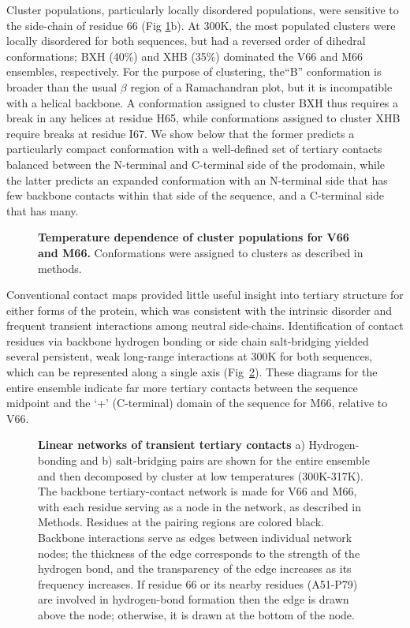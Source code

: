 \documentclass[10pt,letterpaper]{article}
\begin{document}
Cluster populations, particularly locally disordered populations, were sensitive to the side-chain of residue 66 (Fig \ref{fig4}b).  At 300K, the most populated clusters were locally disordered for both sequences, but had a reversed order of dihedral conformations; BXH (40\%) and XHB (35\%) dominated the V66 and M66 ensembles, respectively.   For the purpose of clustering, the``B'' conformation is broader than the usual $\beta$ region of a Ramachandran plot, but it is incompatible with a helical backbone. A conformation assigned to cluster BXH thus requires a break in any helices at residue H65, while conformations assigned to cluster XHB require breaks at residue I67. We show below that the former predicts a particularly compact conformation with a well-defined set of tertiary contacts balanced between the N-terminal and C-terminal side of the prodomain, while the latter predicts an expanded conformation with an N-terminal side that has few backbone contacts within that side of the sequence, and a C-terminal side that has many.  

\begin{figure}[!ht]
\caption{{\bf Temperature dependence of cluster populations for V66 and M66.} Conformations were assigned to clusters as described in methods. }  
\label{fig4} 
\end{figure}

Conventional contact maps provided little useful insight into tertiary structure for either forms of the protein, which was consistent with the intrinsic disorder and frequent transient interactions among neutral side-chains. Identification of contact residues via backbone hydrogen bonding or side chain salt-bridging yielded several persistent, weak long-range interactions at 300K for both sequences, which can be represented along a single axis (Fig~\ref{fig5}). These diagrams for the entire ensemble indicate far more tertiary contacts between the sequence midpoint and the `+' (C-terminal) domain of the sequence for M66, relative to V66. 

\begin{figure}[!ht]
\caption{{\bf Linear networks of transient tertiary contacts} a) Hydrogen-bonding and b) salt-bridging pairs are shown for the entire ensemble and then decomposed by cluster at low temperatures (300K-317K). The backbone tertiary-contact network is made for V66 and M66, with each residue serving as a node in the network, as described in Methods. Residues at the pairing regions are colored black. Backbone interactions serve as edges between individual network nodes; the thickness of the edge corresponds to the strength of the hydrogen bond, and the transparency of the edge increases as its frequency increases. If residue 66 or its nearby residues (A51-P79) are involved in hydrogen-bond formation then the edge is drawn above the node; otherwise, it is drawn at the bottom of the node. }
\label{fig5}
\end{figure}
\end{document}

